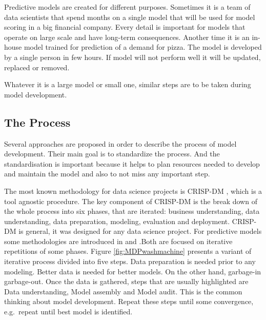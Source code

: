 \documentclass[12pt,]{krantz}
\begin{document}
Predictive models are created for different purposes. Sometimes it is a team of data scientists that spend months on a single model that will be used for model scoring in a big financial company. Every detail is important for models that operate on large scale and have long-term consequences. Another time it is an in-house model trained for prediction of a demand for pizza. The model is developed by a single person in few hours. If model will not perform well it will be updated, replaced or removed.

Whatever it is a large model or small one, similar steps are to be taken during model development.

\hypertarget{MDPprocess}{%
\subsection{The Process}\label{MDPprocess}}

Several approaches are proposed in order to describe the process of model development. Their main goal is to standardize the process. And the standardisation is important because it helps to plan resources needed to develop and maintain the model and also to not miss any important step.

The most known methodology for data science projects is CRISP-DM \citep{crisp1999}, \citep{crisp2019wiki} which is a tool agnostic procedure. The key component of CRISP-DM is the break down of the whole process into six phases, that are iterated: business understanding, data understanding, data preparation, modeling, evaluation and deployment. CRISP-DM is general, it was designed for any data science project. For predictive models some methodologies are introduced in \citep{r4ds2019} and \citep{misconceptions2019}.Both are focused on iterative repetitions of some phases.
Figure \ref{fig:MDPwashmachine} presents a variant of iterative process divided into five steps. Data preparation is needed prior to any modeling. Better data is needed for better models. On the other hand, garbage-in garbage-out. Once the data is gathered, steps that are usually highlighted are Data understanding, Model assembly and Model audit. This is the common thinking about model development. Repeat these steps until some convergence, e.g.~repeat until best model is identified.
\end{document}
